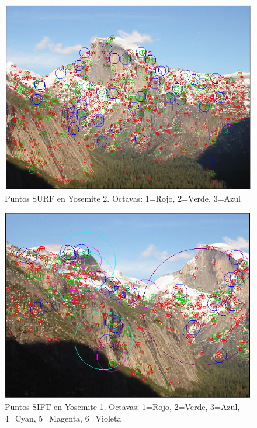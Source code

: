 \documentclass[12pt,spanish]{article} %
\begin{document}
\begin{figure}[H]
  \begin{center}
  \includegraphics[scale=.6]{ej1_surf2_octavas}
  \caption{Puntos SURF en Yosemite 2. Octavas: 1=Rojo, 2=Verde, 3=Azul}
  \label{fig:ej1_surf2_octavas}
  \end{center}
\end{figure}

\begin{figure}[H]
  \begin{center}
  \includegraphics[scale=.6]{ej1_sift1_octavas}
  \caption{Puntos SIFT en Yosemite 1. Octavas: 1=Rojo, 2=Verde, 3=Azul, 4=Cyan, 5=Magenta, 6=Violeta}
  \label{fig:ej1_sift1_octavas}
  \end{center}
\end{figure}
\end{document}
